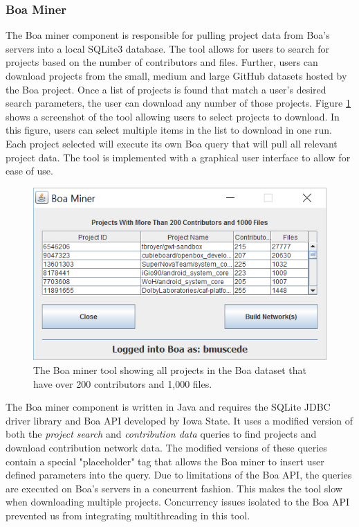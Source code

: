 \documentclass{sig-alternate-05-2015}
\begin{document}
\subsubsection{Boa Miner}
The Boa miner component is responsible for pulling project data from Boa's servers into a local SQLite3 database. The tool allows for users to search for projects based on the number of contributors and files. Further, users can download projects from the small, medium and large GitHub datasets hosted by the Boa project. Once a list of projects is found that match a user's desired search parameters, the user can download any number of those projects. Figure \ref{fig:miner} shows a screenshot of the tool allowing users to select projects to download. In this figure, users can select multiple items in the list to download in one run. Each project selected will execute its own Boa query that will pull all relevant project data. The tool is implemented with a graphical user interface to allow for ease of use.

\begin{figure}
\centering
\includegraphics[scale=0.95]{boa_miner}
\caption{The Boa miner tool showing all projects in the Boa dataset that have over 200 contributors and 1,000 files.}
\label{fig:miner}
\end{figure}

The Boa miner component is written in Java and requires the SQLite JDBC driver library and Boa API developed by Iowa State. It uses a modified version of both the \textit{project search} and \textit{contribution data} queries to find projects and download contribution network data. The modified versions of these queries contain a special "placeholder" tag that allows the Boa miner to insert user defined parameters into the query. Due to limitations of the Boa API, the queries are executed on Boa's servers in a concurrent fashion. This makes the tool slow when downloading multiple projects. Concurrency issues isolated to the Boa API prevented us from integrating multithreading in this tool.  
\end{document}
